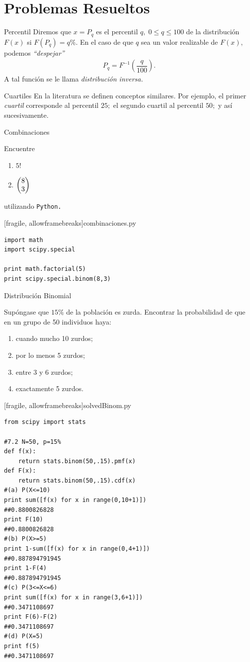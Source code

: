 \section{Problemas Resueltos}
{Percentil}
 Diremos que $x=P_{q}$ es el percentil $q, \; 0\leq q \leq 100$ de la distribución $F(x)$ si $F(P_{q})=q\%.$  En el caso de que $q$ sea un valor realizable de $F(x),$ podemos \emph{``despejar''}
 \begin{align}
  P_{q}=F^{-1}\left( \dfrac{q}{100} \right).
 \end{align}
 A tal función se le llama \emph{distribución inversa.}


{Cuartiles}
 En la literatura se definen conceptos similares. Por ejemplo, el primer \emph{cuartil} corresponde al percentil $25;$ el segundo cuartil al percentil $50;$ y así sucesivamente.

{Combinaciones}
 \begin{ejemplo}
  \label{sol:0.7.1}
  Encuentre
  \begin{enumerate}
   \item $5!$
   \item $\begin{pmatrix} 8 \\ 3\end{pmatrix}$
  \end{enumerate}
  utilizando \texttt{Python.}
 \end{ejemplo}


[fragile, allowframebreaks]{combinaciones.py}
 \begin{verbatim}
import math
import scipy.special

print math.factorial(5)
print scipy.special.binom(8,3)
 \end{verbatim}




{Distribución Binomial}
 \begin{ejemplo}
  \label{sol:0.7.2}
  Supóngase que $15\%$ de la población es zurda. Encontrar la probabilidad de que en un grupo de 50 individuos haya:
  \begin{enumerate}
   \item cuando mucho 10 zurdos; 
   \item por lo menos 5 zurdos; 
   \item entre 3 y 6 zurdos; 
   \item exactamente 5 zurdos.
  \end{enumerate}

 \end{ejemplo}


[fragile, allowframebreaks]{solvedBinom.py}
 \begin{verbatim}
from scipy import stats

#7.2 N=50, p=15%
def f(x):
    return stats.binom(50,.15).pmf(x)
def F(x):
    return stats.binom(50,.15).cdf(x)
#(a) P(X<=10)
print sum([f(x) for x in range(0,10+1)])
##0.8800826828
print F(10)
##0.8800826828
#(b) P(X>=5)
print 1-sum([f(x) for x in range(0,4+1)])
##0.887894791945
print 1-F(4)
##0.887894791945
#(c) P(3<=X<=6)
print sum([f(x) for x in range(3,6+1)])
##0.3471108697
print F(6)-F(2)
##0.3471108697
#(d) P(X=5)
print f(5)
##0.3471108697
 \end{verbatim}



